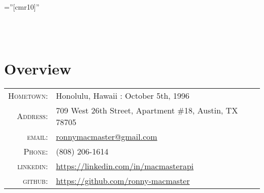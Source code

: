 \documentclass[a4paper,10pt]{article}
\begin{document}

\pagestyle{empty} %

\font\fb=''[cmr10]'' %

\par{\centering
	{} \\\vspace{3mm}
	{} \\\vspace{3mm}
\par}

\section{Overview}

\begin{tabular}{rl}
    \textsc{Hometown:}	& Honolulu, Hawaii : October 5th, 1996 \\
    \textsc{Address:}   & 709 West 26th Street, Apartment \#18, Austin, TX 78705 \\
	\textsc{email:}     & \href{mailto:ronnymacmaster@gmail.com}{ronnymacmaster@gmail.com} \\
	\textsc{Phone:}     & (808) 206-1614 \\ 
	\textsc{linkedin:}	& \href{https://linkedin.com/in/macmasterapi}{https://linkedin.com/in/macmasterapi} \\
	\textsc{\color{medRed}github:}	& \href{https://github.com/ronny-macmaster}{https://github.com/ronny-macmaster} 
\end{tabular}

\end{document}
